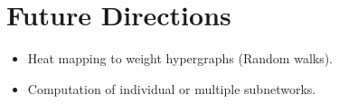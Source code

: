 \documentclass[12pt,twoside]{reedthesis}
\theoremstyle{definition}
\begin{document}
\chapter{Future Directions}
 \begin{itemize}
   \item{Heat mapping to weight hypergraphs (Random walks).}
   \item{Computation of individual or multiple subnetworks.}
 \end{itemize}
%
%
%
%
%
%
%
%
\end{document}
